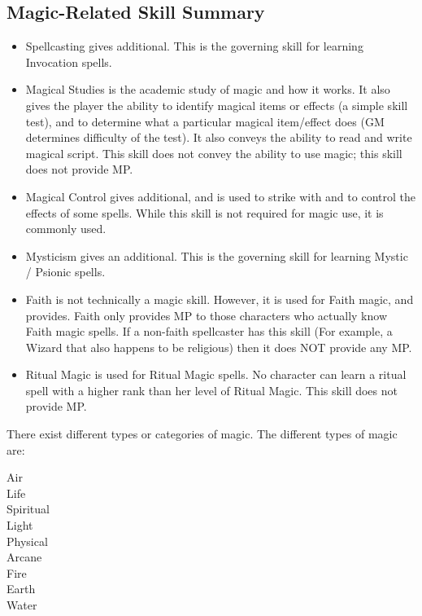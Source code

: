 \documentclass[twoside]{book}
\begin{document}
    

\subsection{Magic-Related Skill Summary}
    
\begin{itemize}
      
  \item Spellcasting gives additional. This is the governing skill for learning Invocation spells.
  \item Magical Studies is the academic study of magic and how it works. It also gives the player the ability to identify magical items or effects (a simple skill test), and to determine what a particular magical item/effect does (GM determines difficulty of the test). It also conveys the ability to read and write magical script. This skill does not convey the ability to use magic; this skill does not provide MP.
  \item Magical Control gives additional, and is used to strike with and to control the effects of some spells. While this skill is not required for magic use, it is commonly used.
  \item Mysticism gives an additional. This is the governing skill for learning Mystic / Psionic spells.
  \item Faith is not technically a magic skill. However, it is used for Faith magic, and provides. Faith only provides MP to those characters who actually know Faith magic spells. If a non-faith spellcaster has this skill (For example, a Wizard that also happens to be religious) then it does NOT provide any MP.
  \item Ritual Magic is used for Ritual Magic spells. No character can learn a ritual spell with a higher rank than her level of Ritual Magic. This skill does not provide MP.
\end{itemize}
  
    {  
    There exist different types or categories of magic. The different types of magic are:
    }
  
\begin{description}
    
  \item[Air] 
  \item[Life] 
  \item[Spiritual] 
  \item[Light] 
  \item[Physical] 
  \item[Arcane] 
  \item[Fire] 
  \item[Earth] 
  \item[Water] 
\end{description}
  
\end{document}
